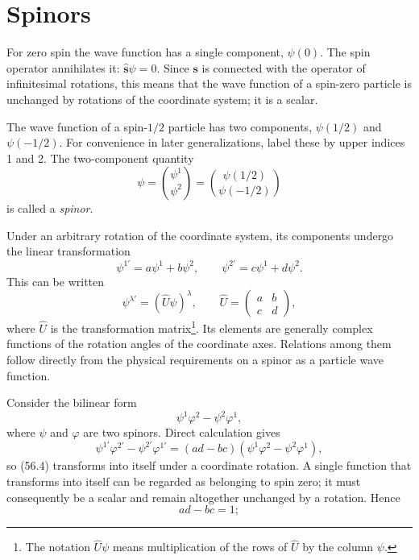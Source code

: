 \section{Spinors}

For zero spin the wave function has a single component, $\psi(0)$. The spin
operator annihilates it: $\hat{\mathbf s}\psi=0$. Since $\mathbf s$ is
connected with the operator of infinitesimal rotations, this means that the
wave function of a spin-zero particle is unchanged by rotations of the
coordinate system; it is a scalar.

The wave function of a spin-$1/2$ particle has two components, $\psi(1/2)$
and $\psi(-1/2)$. For convenience in later generalizations, label these by
upper indices 1 and 2. The two-component quantity
\begin{equation}
 \psi=\binom{\psi^1}{\psi^2}=
 \binom{\psi(1/2)}{\psi(-1/2)}
 \tag{56.1}
\end{equation}
is called a \emph{spinor}.

Under an arbitrary rotation of the coordinate system, its components undergo
the linear transformation
\begin{equation}
 \psi^{1'}=a\psi^1+b\psi^2,\qquad
 \psi^{2'}=c\psi^1+d\psi^2.
 \tag{56.2}
\end{equation}
This can be written
\begin{equation}
 \psi^{\lambda'}=(\hat U\psi)^\lambda,\qquad
 \hat U=\begin{pmatrix}a&b\\c&d\end{pmatrix},
 \tag{56.3}
\end{equation}
where $\hat U$ is the transformation matrix\footnote{The notation
$\hat U\psi$ means multiplication of the rows of $\hat U$ by the column
$\psi$.}. Its elements are generally complex functions of the rotation angles
of the coordinate axes. Relations among them follow directly from the
physical requirements on a spinor as a particle wave function.

Consider the bilinear form
\begin{equation}
 \psi^1\varphi^2-\psi^2\varphi^1,
 \tag{56.4}
\end{equation}
where $\psi$ and $\varphi$ are two spinors. Direct calculation gives
\[
 \psi^{1'}\varphi^{2'}-\psi^{2'}\varphi^{1'}
 =(ad-bc)(\psi^1\varphi^2-\psi^2\varphi^1),
\]
so (56.4) transforms into itself under a coordinate rotation. A single
function that transforms into itself can be regarded
as belonging to spin zero; it must consequently be a
scalar and remain altogether unchanged by a
rotation. Hence
\begin{equation}
 ad-bc=1;
 \tag{56.5}
\end{equation}


